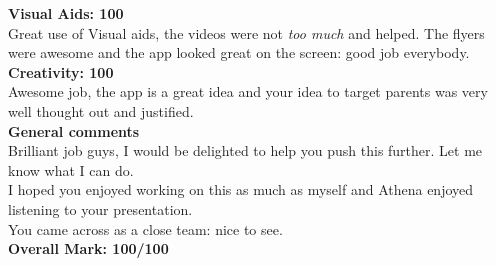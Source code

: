 \documentclass{article}
\begin{document}
\textbf{Visual Aids: 100}\\

Great use of Visual aids, the videos were not \textit{too much} and helped.
The flyers were awesome and the app looked great on the screen: good job everybody.\\

\textbf{Creativity: 100}\\

Awesome job, the app is a great idea and your idea to target parents was very well thought out and justified.\\

\textbf{General comments}\\

Brilliant job guys, I would be delighted to help you push this further.
Let me know what I can do.\\

I hoped you enjoyed working on this as much as myself and Athena enjoyed listening to your presentation.\\

You came across as a close team: nice to see.\\

\textbf{Overall Mark: 100/100}
\end{document}
